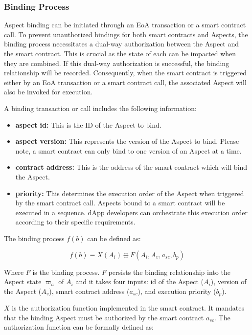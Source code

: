\subsubsection{Binding Process}

Aspect binding can be initiated through an EoA transaction or a smart contract call. To prevent unauthorized bindings for both smart contracts and Aspects, the binding process necessitates a dual-way authorization between the Aspect and the smart contract. This is crucial as the state of each can be impacted when they are combined. If this dual-way authorization is successful, the binding relationship will be recorded. Consequently, when the smart contract is triggered either by an EoA transaction or a smart contract call, the associated Aspect will also be invoked for execution.

A binding transaction or call includes the following information:

\begin{itemize}
  \item \textbf{aspect id:} This is the ID of the Aspect to bind.
  \item \textbf{aspect version:} This represents the version of the Aspect to bind. Please note, a smart contract can only bind to one version of an Aspect at a time.
  \item \textbf{contract address:} This is the address of the smart contract which will bind the Aspect.
  \item \textbf{priority:} This determines the execution order of the Aspect when triggered by the smart contract call. Aspects bound to a smart contract will be executed in a sequence. dApp developers can orchestrate this execution order according to their specific requirements.
\end{itemize}

The binding process $f(b)$ can be defined as:

\[
f(b) \equiv X(A_i) \oplus F(A_i, A_v,a_{sc},b_p)
\]

Where $F$ is the binding process. $F$ persists the binding relationship into the Aspect state $\varpi_a$ of $A_i$ and it takes four inputs: id of the Aspect ($A_i$), version of the Aspect ($A_v$), smart contract address ($a_{sc}$), and execution priority ($b_p$).

$X$ is the authorization function implemented in the smart contract. It mandates that the binding Aspect must be authorized by the smart contract $a_{sc}$. The authorization function can be formally defined as:

